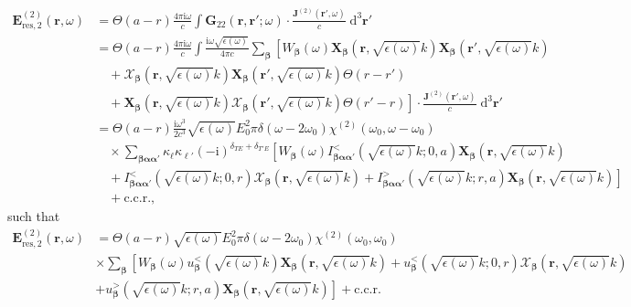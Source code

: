 \documentclass{article}
\begin{document}
\begin{equation}
\begin{split}
\mathbf{E}_{\mathrm{res},2}^{(2)}(\mathbf{r},\omega) &= \Theta(a - r)\frac{4\pi\mathrm{i}\omega}{c}\int\mathbf{G}_{22}(\mathbf{r},\mathbf{r}';\omega)\cdot\frac{\mathbf{J}^{(2)}(\mathbf{r}',\omega)}{c}\;\mathrm{d}^3\mathbf{r}'\\
&=\Theta(a-r)\frac{4\pi\mathrm{i}\omega}{c}\int\frac{\mathrm{i}\omega\sqrt{\epsilon(\omega)}}{4\pi c}\sum_{\bm{\beta}}\left[W_{\bm{\beta}}(\omega)\mathbf{X}_{\bm{\beta}}\!\left(\mathbf{r},\sqrt{\epsilon(\omega)}k\right)\mathbf{X}_{\bm{\beta}}\!\left(\mathbf{r}',\sqrt{\epsilon(\omega)}k\right)\right.\\
&\quad+\bm{\mathcal{X}}_{\bm{\beta}}\!\left(\mathbf{r},\sqrt{\epsilon(\omega)}k\right)\mathbf{X}_{\bm{\beta}}\!\left(\mathbf{r}',\sqrt{\epsilon(\omega)}k\right)\Theta(r - r')\\
&\quad + \left.\mathbf{X}_{\bm{\beta}}\!\left(\mathbf{r},\sqrt{\epsilon(\omega)}k\right)\bm{\mathcal{X}}_{\bm{\beta}}\!\left(\mathbf{r}',\sqrt{\epsilon(\omega)}k\right)\Theta(r' - r)\right]\cdot\frac{\mathbf{J}^{(2)}(\mathbf{r}',\omega)}{c}\;\mathrm{d}^3\mathbf{r}'\\
&=\Theta(a - r)\frac{\mathrm{i}\omega^3}{2c^3}\sqrt{\epsilon(\omega)}E_0^2\pi\delta(\omega - 2\omega_0)\chi^{(2)}(\omega_0,\omega - \omega_0)\\
&\quad\times\sum_{\bm{\beta}\bm{\alpha}\bm{\alpha}'}\kappa_\ell\kappa_{\ell'}(-\mathrm{i})^{\delta_{TE} + \delta_{T'E}}\left[W_{\bm{\beta}}(\omega)I_{\bm{\beta}\bm{\alpha}\bm{\alpha}'}^<\!\left(\sqrt{\epsilon(\omega)}k;0,a\right)\mathbf{X}_{\bm{\beta}}\!\left(\mathbf{r},\sqrt{\epsilon(\omega)}k\right)\right.\\
&\quad + \left.I_{\bm{\beta}\bm{\alpha}\bm{\alpha}'}^<\!\left(\sqrt{\epsilon(\omega)}k;0,r\right)\bm{\mathcal{X}}_{\bm{\beta}}\!\left(\mathbf{r},\sqrt{\epsilon(\omega)}k\right) + I_{\bm{\beta}\bm{\alpha}\bm{\alpha}'}^>\!\left(\sqrt{\epsilon(\omega)}k;r,a\right)\mathbf{X}_{\bm{\beta}}\!\left(\mathbf{r},\sqrt{\epsilon(\omega)}k\right)\right]\\
&\quad + \mathrm{c.c.r.},
\end{split}
\end{equation}
such that
\begin{equation}
\begin{split}
\mathbf{E}_{\mathrm{res},2}^{(2)}(\mathbf{r},\omega) &=\Theta(a - r)\sqrt{\epsilon(\omega)}E_0^2\pi\delta(\omega - 2\omega_0)\chi^{(2)}(\omega_0,\omega_0)\\
&\times\sum_{\bm{\beta}}\left[W_{\bm{\beta}}(\omega)u_{\bm{\beta}}^<\!\left(\sqrt{\epsilon(\omega)}k\right)\mathbf{X}_{\bm{\beta}}\!\left(\mathbf{r},\sqrt{\epsilon(\omega)}k\right) + u_{\bm{\beta}}^<\!\left(\sqrt{\epsilon(\omega)}k;0,r\right)\bm{\mathcal{X}}_{\bm{\beta}}\!\left(\mathbf{r},\sqrt{\epsilon(\omega)}k\right)\right.\\
&+ \left.u_{\bm{\beta}}^>\!\left(\sqrt{\epsilon(\omega)}k;r,a\right)\mathbf{X}_{\bm{\beta}}\!\left(\mathbf{r},\sqrt{\epsilon(\omega)}k\right)\right] + \mathrm{c.c.r.}
\end{split}
\end{equation}
\end{document}
